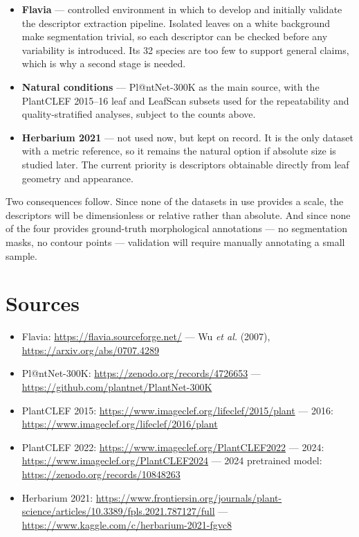 \documentclass[11pt,a4paper]{article}
\begin{document}
\begin{itemize}[leftmargin=1.4em,itemsep=0.3em,topsep=0.2em]
  \item \textbf{Flavia} --- controlled environment in which to develop and
        initially validate the descriptor extraction pipeline. Isolated leaves
        on a white background make segmentation trivial, so each descriptor can
        be checked before any variability is introduced. Its 32 species are too
        few to support general claims, which is why a second stage is needed.
  \item \textbf{Natural conditions} --- Pl@ntNet-300K as the main source, with
        the PlantCLEF 2015--16 leaf and LeafScan subsets used for the
        repeatability and quality-stratified analyses, subject to the counts
        above.
  \item \textbf{Herbarium 2021} --- not used now, but kept on record. It is the
        only dataset with a metric reference, so it remains the natural option
        if absolute size is studied later. The current priority is descriptors
        obtainable directly from leaf geometry and appearance.
\end{itemize}

Two consequences follow. Since none of the datasets in use provides a scale,
the descriptors will be dimensionless or relative rather than absolute. And
since none of the four provides ground-truth morphological annotations --- no
segmentation masks, no contour points --- validation will require manually
annotating a small sample.

\section*{Sources}

\begingroup
\small
\begin{itemize}[leftmargin=1.4em,itemsep=0.15em,topsep=0.2em]
  \item Flavia: \url{https://flavia.sourceforge.net/} ---
        Wu \textit{et al.} (2007), \url{https://arxiv.org/abs/0707.4289}
  \item Pl@ntNet-300K: \url{https://zenodo.org/records/4726653} ---
        \url{https://github.com/plantnet/PlantNet-300K}
  \item PlantCLEF 2015: \url{https://www.imageclef.org/lifeclef/2015/plant} ---
        2016: \url{https://www.imageclef.org/lifeclef/2016/plant}
  \item PlantCLEF 2022: \url{https://www.imageclef.org/PlantCLEF2022} ---
        2024: \url{https://www.imageclef.org/PlantCLEF2024} ---
        2024 pretrained model: \url{https://zenodo.org/records/10848263}
  \item Herbarium 2021:
        \url{https://www.frontiersin.org/journals/plant-science/articles/10.3389/fpls.2021.787127/full}
        --- \url{https://www.kaggle.com/c/herbarium-2021-fgvc8}
\end{itemize}
\endgroup
\end{document}
